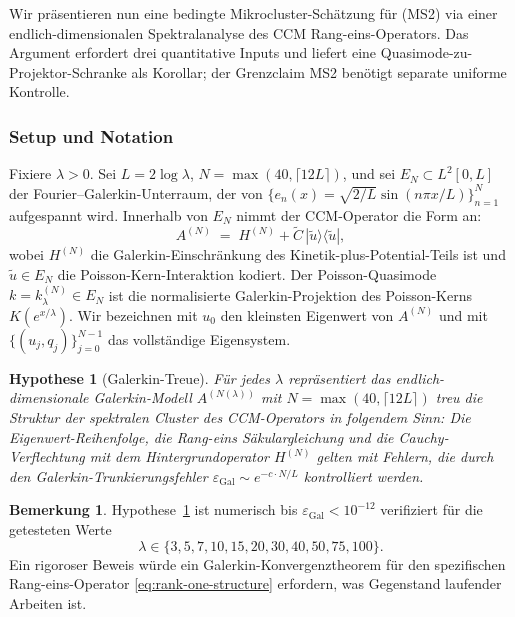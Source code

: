 \documentclass[11pt,a4paper]{article}
\theoremstyle{plain}
\newtheorem{hypothesis}[theorem]{Hypothese}
\theoremstyle{definition}
\newtheorem{remark}[theorem]{Bemerkung}
\begin{document}
Wir präsentieren nun eine bedingte Mikrocluster-Schätzung für (MS2) via einer
endlich-dimensionalen Spektralanalyse des CCM Rang-eins-Operators.
Das Argument erfordert drei quantitative Inputs und liefert eine
Quasimode-zu-Projektor-Schranke als Korollar; der Grenzclaim MS2 benötigt
separate uniforme Kontrolle.

\subsubsection{Setup und Notation}

Fixiere $\lambda > 0$. Sei $L = 2\log\lambda$, $N = \max(40,
\lceil 12L \rceil)$, und sei $E_N \subset L^2[0,L]$ der Fourier--Galerkin-Unterraum,
der von $\{e_n(x) = \sqrt{2/L} \sin(n\pi x/L)\}_{n=1}^N$ aufgespannt wird. Innerhalb
von $E_N$ nimmt der CCM-Operator die Form an:
\begin{equation}\label{eq:rank-one-structure}
  A^{(N)} \;=\; H^{(N)} + \tilde{C}\,|\tilde{u}\rangle\langle\tilde{u}|,
\end{equation}
wobei $H^{(N)}$ die Galerkin-Einschränkung des Kinetik-plus-Potential-Teils ist
und $\tilde{u} \in E_N$ die Poisson-Kern-Interaktion kodiert.
Der Poisson-Quasimode $k = k_\lambda^{(N)} \in E_N$ ist die normalisierte
Galerkin-Projektion des Poisson-Kerns $K(e^{x/\lambda})$.
Wir bezeichnen mit $u_0$ den kleinsten Eigenwert von $A^{(N)}$ und
mit $\{(u_j, q_j)\}_{j=0}^{N-1}$ das vollständige Eigensystem.

\begin{hypothesis}[Galerkin-Treue]
\label{hyp:galerkin}
Für jedes $\lambda$ repräsentiert das endlich-dimensionale Galerkin-Modell
$A^{(N(\lambda))}$ mit $N = \max(40, \lceil 12L \rceil)$ treu die Struktur der
spektralen Cluster des CCM-Operators in folgendem Sinn: Die Eigenwert-Reihenfolge,
die Rang-eins Säkulargleichung und die Cauchy-Verflechtung mit dem Hintergrundoperator
$H^{(N)}$ gelten mit Fehlern, die durch den Galerkin-Trunkierungsfehler
$\varepsilon_{\mathrm{Gal}} \sim e^{-c \cdot N/L}$ kontrolliert werden.
\end{hypothesis}

\begin{remark}
Hypothese~\ref{hyp:galerkin} ist numerisch bis $\varepsilon_{\mathrm{Gal}} < 10^{-12}$
verifiziert für die getesteten Werte
\[
  \lambda \in \{3,5,7,10,15,20,30,40,50,75,100\}.
\]
Ein rigoroser Beweis würde ein Galerkin-Konvergenztheorem für den spezifischen
Rang-eins-Operator \eqref{eq:rank-one-structure} erfordern, was Gegenstand
laufender Arbeiten ist.
\end{remark}
\end{document}
